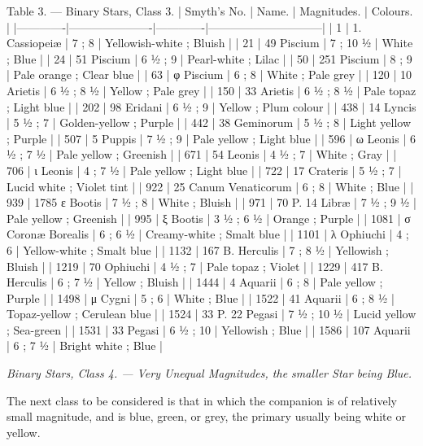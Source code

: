 \documentclass[a4paper, 12pt, oneside, polutonikogreek, english]{article}
\begin{document}
Table 3. --- Binary Stars, Class 3. 
| Smyth’s No. | Name.        | Magnitudes. | Colours.           |
|-------------|----------------------|-------------|------------------------------|
| 1      | 1. Cassiopeiæ    | 7 ; 8    | Yellowish-white ; Bluish   |
| 21     | 49 Piscium      | 7 ; 10 ½  | White ; Blue         |
| 24     | 51 Piscium      | 6 ½ ; 9   | Pearl-white ; Lilac     |
| 50     | 251 Piscium     | 8 ; 9    | Pale orange ; Clear blue   |
| 63     | φ Piscium      | 6 ; 8    | White ; Pale grey      |
| 120     | 10 Arietis      | 6 ½ ; 8 ½  | Yellow ; Pale grey      |
| 150     | 33 Arietis      | 6 ½ ; 8 ½  | Pale topaz ; Light blue   |
| 202     | 98 Eridani      | 6 ½ ; 9   | Yellow ; Plum colour     |
| 438     | 14 Lyncis      | 5 ½ ; 7   | Golden-yellow ; Purple    |
| 442     | 38 Geminorum     | 5 ½ ; 8   | Light yellow ; Purple    |
| 507     | 5 Puppis       | 7 ½ ; 9   | Pale yellow ; Light blue   |
| 596     | ω Leonis       | 6 ½ ; 7 ½  | Pale yellow ; Greenish    |
| 671     | 54 Leonis      | 4 ½ ; 7   | White ; Gray         |
| 706     | ι Leonis       | 4 ; 7 ½   | Pale yellow ; Light blue   |
| 722     | 17 Crateris     | 5 ½ ; 7   | Lucid white ; Violet tint  |
| 922     | 25 Canum Venaticorum | 6 ; 8    | White ; Blue         |
| 939     | 1785 ε Bootis    | 7 ½ ; 8   | White ; Bluish        |
| 971     | 70 P. 14 Libræ    | 7 ½ ; 9 ½  | Pale yellow ; Greenish    |
| 995     | ξ Bootis       | 3 ½ ; 6 ½  | Orange ; Purple       |
| 1081    | σ Coronæ Borealis  | 6 ; 6 ½   | Creamy-white ; Smalt blue  |
| 1101    | λ Ophiuchi      | 4 ; 6    | Yellow-white ; Smalt blue  |
| 1132    | 167 B. Herculis   | 7 ; 8 ½   | Yellowish ; Bluish      |
| 1219    | 70 Ophiuchi     | 4 ½ ; 7   | Pale topaz ; Violet     |
| 1229    | 417 B. Herculis   | 6 ; 7 ½   | Yellow ; Bluish       |
| 1444    | 4 Aquarii      | 6 ; 8    | Pale yellow ; Purple     |
| 1498    | μ Cygni       | 5 ; 6    | White ; Blue         |
| 1522    | 41 Aquarii      | 6 ; 8 ½   | Topaz-yellow ; Cerulean blue |
| 1524    | 33 P. 22 Pegasi   | 7 ½ ; 10 ½ | Lucid yellow ; Sea-green   |
| 1531    | 33 Pegasi      | 6 ½ ; 10  | Yellowish ; Blue       |
| 1586    | 107 Aquarii     | 6 ; 7 ½   | Bright white ; Blue     |

\emph{Binary Stars, Class 4. --- Very Unequal Magnitudes, the smaller Star being Blue.}

The next class to be considered is that in which the companion is of relatively small magnitude, and is blue, green, or grey, the primary usually being white or yellow.
\end{document}
